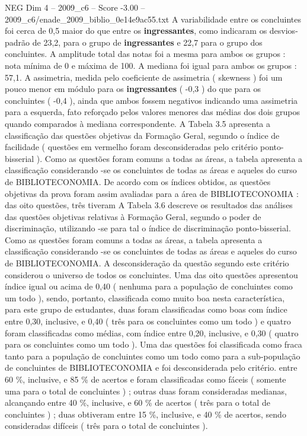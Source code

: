 \begin{textsample}{NEG Dim 4 – 2009\_c6 – Score -3.00 – 2009\_c6/enade\_2009\_biblio\_0e14e9ac55.txt}
A variabilidade entre os concluintes foi cerca de 0,5 maior do que entre os \textbf{ingressantes}, como indicaram os desvios-padrão de 23,2, para o grupo de \textbf{ingressantes} e 22,7 para o grupo dos concluintes.
A amplitude total das notas foi a mesma para ambos os grupos : nota mínima de 0 e máxima de 100.
A mediana foi igual para ambos os grupos : 57,1.
A assimetria, medida pelo coeficiente de assimetria ( skewness ) foi um pouco menor em módulo para os \textbf{ingressantes} ( -0,3 ) do que para os concluintes ( -0,4 ), ainda que ambos fossem negativos indicando uma assimetria para a esquerda, fato reforçado pelos valores menores das médias dos dois grupos quando comparados à mediana correspondente.
A Tabela 3.5 apresenta a classificação das questões objetivas da Formação Geral, segundo o índice de facilidade ( questões em vermelho foram desconsideradas pelo critério ponto-bisserial ).
Como as questões foram comuns a todas as áreas, a tabela apresenta a classificação considerando -se os concluintes de todas as áreas e aqueles do curso de BIBLIOTECONOMIA.
De acordo com os índices obtidos, as questões objetivas da prova foram assim avaliadas para a área de BIBLIOTECONOMIA : das oito questões, três tiveram A Tabela 3.6 descreve os resultados das análises das questões objetivas relativas à Formação Geral, segundo o poder de discriminação, utilizando -se para tal o índice de discriminação ponto-bisserial.
Como as questões foram comuns a todas as áreas, a tabela apresenta a classificação considerando -se os concluintes de todas as áreas e aqueles do curso de BIBLIOTECONOMIA.
A desconsideração da questão segundo este critério considerou o universo de todos os concluintes.
Uma das oito questões apresentou índice igual ou acima de 0,40 ( nenhuma para a população de concluintes como um todo ), sendo, portanto, classificada como muito boa nesta característica, para este grupo de estudantes, duas foram classificadas como boas com índice entre 0,30, inclusive, e 0,40 ( três para os concluintes como um todo ) e quatro foram classificadas como médias, com índice entre 0,20, inclusive, e 0,30 ( quatro para os concluintes como um todo ).
Uma das questões foi classificada como fraca tanto para a população de concluintes como um todo como para a sub-população de concluintes de BIBLIOTECONOMIA e foi desconsiderada pelo critério. entre 60 \%, inclusive, e 85 \% de acertos e foram classificadas como fáceis ( somente uma para o total de concluintes ) ; outras duas foram consideradas medianas, alcançando entre 40 \%, inclusive, e 60 \% de acertos ( três para o total de concluintes ) ; duas obtiveram entre 15 \%, inclusive, e 40 \% de acertos, sendo consideradas difíceis ( três para o total de concluintes ).

\end{textsample}
